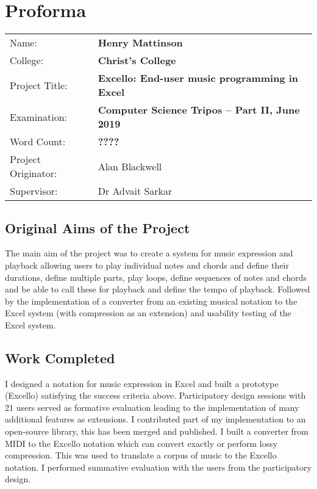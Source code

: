 \pagestyle{plain}

\chapter*{Proforma}

{\large
\begin{tabular}{ll}
Name:               & \bf Henry Mattinson                      \\
College:            & \bf Christ's College                     \\
Project Title:      & \bf Excello: End-user music programming in Excel \\
Examination:        & \bf Computer Science Tripos -- Part II, June 2019  \\
Word Count:         & \bf ????\footnotemark[1]  \\
Project Originator: & Alan Blackwell                    \\
Supervisor:         & Dr Advait Sarkar                    \\
\end{tabular}
}


\section*{Original Aims of the Project}

The main aim of the project was to create a system for music expression and playback allowing users to play individual notes and chords and define their durations, define multiple parts, play loops, define sequences of notes and chords and be able to call these for playback and define the tempo of playback. Followed by the implementation of a converter from an existing musical notation to the Excel system (with compression as an extension) and usability testing of the Excel system.

\section*{Work Completed}

I designed a notation for music expression in Excel and built a prototype (Excello) satisfying the success criteria above. Participatory design sessions with 21 users served as formative evaluation leading to the implementation of many additional features as extensions. I contributed part of my implementation to an open-source library, this has been merged and published. I built a converter from MIDI to the Excello notation which can convert exactly or perform lossy compression. This was used to translate a corpus of music to the Excello notation. I performed summative evaluation with the users from the participatory design.

